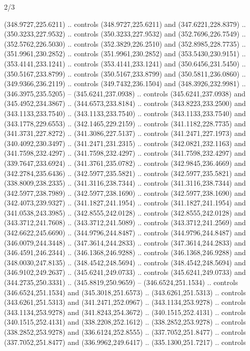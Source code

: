 \begin{flagdescription}{2/3}
\begin{scope}[xshift=0.5\flaglength,yshift=0.5\flagwidth,scale=\flagwidth/318.91]
\begin{scope}[y=0.8pt, x=0.8pt, yscale=-1,shift={(-298.97,-199.32)}]
  (348.9727,225.6211) .. controls (348.9727,225.6211) and (347.6221,228.8379) ..
  (350.3233,227.9532) .. controls (350.3233,227.9532) and (352.7696,226.7549) ..
  (352.5762,226.5030) .. controls (352.3829,226.2510) and (352.8985,228.7735) ..
  (351.9961,230.2852) .. controls (351.9961,230.2852) and (353.5430,230.9151) ..
  (353.4141,233.1241) .. controls (353.4141,233.1241) and (350.6456,231.5450) ..
  (350.5167,233.8799) .. controls (350.5167,233.8799) and (350.5811,236.0860) ..
  (349.9366,236.2119) .. controls (349.7432,236.1504) and (348.3926,232.9981) ..
  (346.3975,235.5205) -- (345.6241,237.0938) .. controls (345.6241,237.0938) and
  (345.4952,234.3867) .. (344.6573,233.8184) .. controls (343.8223,233.2500) and
  (343.1133,233.7540) .. (343.1133,233.7540) .. controls (343.1133,233.7540) and
  (343.1778,229.6553) .. (342.1465,229.2159) .. controls (341.1182,228.7735) and
  (341.3731,227.8272) .. (341.3086,227.5137) .. controls (341.2471,227.1973) and
  (340.4092,230.3497) .. (341.2471,231.2315) .. controls (342.0821,232.1163) and
  (341.7598,232.4297) .. (341.7598,232.4297) .. controls (341.7598,232.4297) and
  (339.7647,233.6924) .. (341.3761,235.0782) .. controls (342.9845,236.4669) and
  (342.2784,235.6436) .. (342.5977,235.5821) .. controls (342.5977,235.5821) and
  (338.8009,238.2335) .. (341.3116,238.7344) .. controls (341.3116,238.7344) and
  (342.5977,238.7989) .. (342.5977,238.1690) .. controls (342.5977,238.1690) and
  (342.4073,239.9327) .. (341.1827,241.1954) .. controls (341.1827,241.1954) and
  (341.0538,243.3985) .. (342.8555,242.0128) .. controls (342.8555,242.0128) and
  (343.3712,241.7608) .. (343.3712,241.5089) .. controls (343.3712,241.2569) and
  (342.6622,245.6690) .. (344.9796,244.8487) .. controls (344.9796,244.8487) and
  (346.0079,244.3448) .. (347.3614,244.2833) .. controls (347.3614,244.2833) and
  (346.4591,246.2344) .. (346.1368,246.9288) .. controls (346.1368,246.9288) and
  (348.0030,247.8135) .. (348.4542,248.5694) .. controls (348.4542,248.5694) and
  (346.9102,249.2637) .. (345.6241,249.0733) .. controls (345.6241,249.0733) and
  (344.2735,250.3331) .. (345.8819,250.9659) -- (346.6524,251.1534) .. controls
  (346.6524,251.1534) and (345.3018,251.6573) .. (343.6261,251.5313) .. controls
  (343.6261,251.5313) and (341.2471,252.0967) .. (343.1134,253.9278) .. controls
  (343.1134,253.9278) and (341.8243,254.3672) .. (340.1515,252.4131) .. controls
  (340.1515,252.4131) and (338.2208,252.1612) .. (338.2852,253.9278) .. controls
  (338.2852,253.9278) and (336.6124,252.8555) .. (337.7052,251.8477) .. controls
  (337.7052,251.8477) and (336.9962,249.6417) .. (335.1300,251.7217) .. controls

\end{scope}
\end{scope}
\end{flagdescription}
